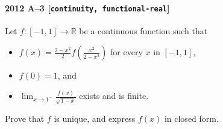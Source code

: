 \paragraph{2012 A--3 \textnormal{[\texttt{continuity, functional-real}]}}
Let $f: [-1, 1] \to \mathbb{R}$ be a continuous function such that
\begin{itemize}
\item[(i)]
$f(x) = \frac{2-x^2}{2} f \left( \frac{x^2}{2-x^2} \right)$ for every $x$ in $[-1, 1]$,
\item[(ii)]
$f(0) = 1$, and
\item[(iii)]
$\lim_{x \to 1^-} \frac{f(x)}{\sqrt{1-x}}$ exists and is finite.
\end{itemize}
Prove that $f$ is unique, and express $f(x)$ in closed form.
